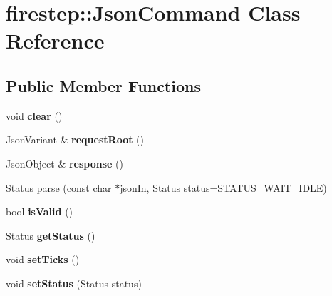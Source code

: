 \hypertarget{classfirestep_1_1_json_command}{\section{firestep\+:\+:Json\+Command Class Reference}
\label{classfirestep_1_1_json_command}
}
\subsection*{Public Member Functions}
\begin{DoxyCompactItemize}
\item 
\hypertarget{classfirestep_1_1_json_command_ac83671bb231c397f90a69d80a661b22b}{void {\bfseries clear} ()}\label{classfirestep_1_1_json_command_ac83671bb231c397f90a69d80a661b22b}

\item 
\hypertarget{classfirestep_1_1_json_command_ae255c66670150f7e2f3f00a1c613e7bb}{Json\+Variant \& {\bfseries request\+Root} ()}\label{classfirestep_1_1_json_command_ae255c66670150f7e2f3f00a1c613e7bb}

\item 
\hypertarget{classfirestep_1_1_json_command_afe7d7d544df5026b32813aeec691a746}{Json\+Object \& {\bfseries response} ()}\label{classfirestep_1_1_json_command_afe7d7d544df5026b32813aeec691a746}

\item 
Status \hyperlink{classfirestep_1_1_json_command_a569a3db08111c18c7a56d18f507c26b3}{parse} (const char $\ast$json\+In, Status status=S\+T\+A\+T\+U\+S\+\_\+\+W\+A\+I\+T\+\_\+\+I\+D\+L\+E)
\item 
\hypertarget{classfirestep_1_1_json_command_a58e091d27a40ac612cf3627d52f1ac53}{bool {\bfseries is\+Valid} ()}\label{classfirestep_1_1_json_command_a58e091d27a40ac612cf3627d52f1ac53}

\item 
\hypertarget{classfirestep_1_1_json_command_aa2f8350ff5c70fab26adea09590dda71}{Status {\bfseries get\+Status} ()}\label{classfirestep_1_1_json_command_aa2f8350ff5c70fab26adea09590dda71}

\item 
\hypertarget{classfirestep_1_1_json_command_a1e1211ff3366029bcbc8cc3a880c17f2}{void {\bfseries set\+Ticks} ()}\label{classfirestep_1_1_json_command_a1e1211ff3366029bcbc8cc3a880c17f2}

\item 
\hypertarget{classfirestep_1_1_json_command_ad609d3cde9564aabf3a7319fdd8732ec}{void {\bfseries set\+Status} (Status status)}\label{classfirestep_1_1_json_command_ad609d3cde9564aabf3a7319fdd8732ec}


\end{DoxyCompactItemize}
